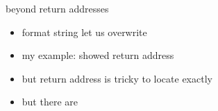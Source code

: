 \begin{frame}{beyond return addresses}
    \begin{itemize}
    \item format string let us overwrite 
    \item my example: showed return address
    \item but return address is tricky to locate exactly
    \item but there are 
    \end{itemize}
\end{frame}
